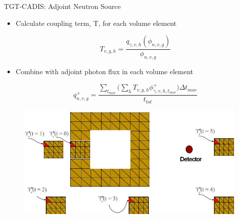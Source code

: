 \documentclass{beamer}
\begin{document}
\begin{frame}{TGT-CADIS: Adjoint Neutron Source}
	\begin{itemize}
          \item{Calculate coupling term, T, for each volume element}

	    \begin{equation}\label{eq:T}
	  	T_{v,g,h} = \dfrac{q_{\gamma,v,h}(\phi_{n,v,g})}{\phi_{n,v,g}}
	    \end{equation}

	  \item{Combine with adjoint photon flux in each volume element}

	    \begin{equation}\label{eq:tgt_n_src}
	    	q_{n,v,g}^{+} = \frac
	    	{\sum_{t_{mov}}\big(\sum_{h} T_{v,g,h}
	    	\phi_{\gamma,v,h,t_{mov}}^{+}\big) \Delta t_{mov}}
	    	{t_{tot}}
	    \end{equation}
	\end{itemize}
        \begin{figure}
	\centering
		\vspace{0.3cm}
	\includegraphics[scale=0.280]{mesh_total.jpg}
	\end{figure}

\end{frame}

\end{document}
